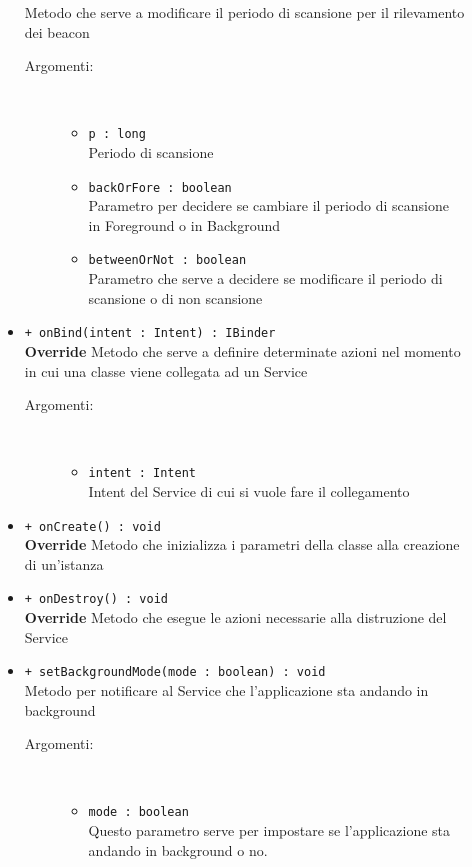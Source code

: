 \documentclass[../DefinizioneDiProdotto.tex]{subfiles}
\begin{document}
\begin{description}
\begin{itemize}
Metodo che serve a modificare il periodo di scansione per il rilevamento dei beacon
 \begin{description}
\item[Argomenti:] \
\begin{itemize}
\item \texttt{p : long}\\
Periodo di scansione\item \texttt{backOrFore : boolean}\\
Parametro per decidere se cambiare il periodo di scansione in Foreground o in Background\item \texttt{betweenOrNot : boolean}\\
Parametro che serve a decidere se modificare il periodo di scansione o di non scansione\end{itemize}
\end{description}
\item \texttt{+ onBind(intent : Intent) : IBinder}\\
\textbf{Override} Metodo che serve a definire determinate azioni nel momento in cui una classe viene collegata ad un Service 
 \begin{description}
\item[Argomenti:] \
\begin{itemize}
\item \texttt{intent : Intent}\\
Intent del Service di cui  si vuole fare il collegamento  \end{itemize}
\end{description}
\item \texttt{+ onCreate() : void}\\
\textbf{Override} Metodo che inizializza i parametri della classe alla creazione di un'istanza
 \item \texttt{+ onDestroy() : void}\\
\textbf{Override} Metodo che esegue le azioni necessarie alla distruzione del Service
 \item \texttt{+ setBackgroundMode(mode : boolean) : void}\\
Metodo per notificare al Service che l'applicazione sta andando in background 
 \begin{description}
\item[Argomenti:] \
\begin{itemize}
\item \texttt{mode : boolean}\\
Questo parametro serve per impostare se l'applicazione sta andando in background o no.\end{itemize}

\end{description}
\end{itemize}
\end{description}
\end{document}
